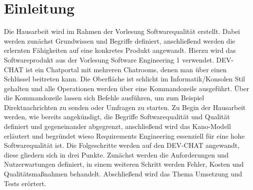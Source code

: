 \section{Einleitung}
Die Hausarbeit wird im Rahmen der Vorlesung Softwarequalität erstellt.
Dabei werden zunächst Grundwissen und Begriffe definiert, anschließend werden die erlernten Fähigkeiten auf eine konkretes Produkt angewandt.
Hierzu wird das Softwareprodukt  aus der Vorlesung Software Engineering 1 verwendet.
\newparagraph
DEV-CHAT ist ein Chatportal mit mehreren Chatrooms, denen man über einen Schlüssel beitreten kann.
Die Oberfläche ist schlicht im Informatik/Konsolen Stil gehalten und alle Operationen werden über eine Kommandozeile ausgeführt.
Über die Kommandozeile lassen sich Befehle ausführen, um zum Beispiel Direktnachrichten zu senden oder Umfragen zu starten.
\newparagraph
Zu Begin der Hausarbeit werden, wie bereits angekündigt, die Begriffe Softwarequalität und Qualität definiert und gegeneinander abgegrenzt, anschließend wird das Kano-Modell erläutert und begründet wieso Requirements Engineering essenziell für eine hohe Softwarequalität ist.
Die Folgeschritte werden auf den DEV-CHAT angewandt, diese gliedern sich in drei Punkte.
Zunächst werden die Anforderungen und Nutzerwartungen definiert, in einem weiteren Schritt werden Fehler, Kosten und Qualitätsmaßnahmen behandelt.
Abschließend wird das Thema Umsetzung und Tests erörtert.